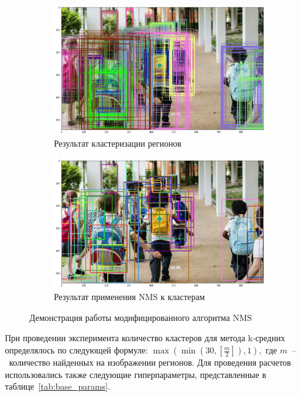 \documentclass[a4paper,14pt]{article}
\begin{document}
    \begin{figure}[H]
        \centering
        \begin{subfigure}{.5\textwidth}
            \centering
            \includegraphics[width=\linewidth]{images/before_nms}
            \caption{Результат кластеризации регионов}
            \label{fig:nms1}
        \end{subfigure}%
        \begin{subfigure}{.5\textwidth}
            \centering
            \includegraphics[width=\linewidth]{images/after_nms}
            \caption{Результат применения NMS к кластерам}
            \label{fig:nms2}
        \end{subfigure}
        \caption{Демонстрация работы модифицированного алгоритма NMS}
        \label{fig:nms}
    \end{figure}

    При проведении эксперимента количество кластеров для метода k-средних определялось по следующей формуле:
    $\max(\min(30, \left[\frac{m}{2}\right]), 1),$ где $m$~--~количество найденных на изображении регионов.
    Для проведения расчетов использовались также следующие гиперпараметры, представленные в таблице~\ref{tab:base_params}.
\end{document}
